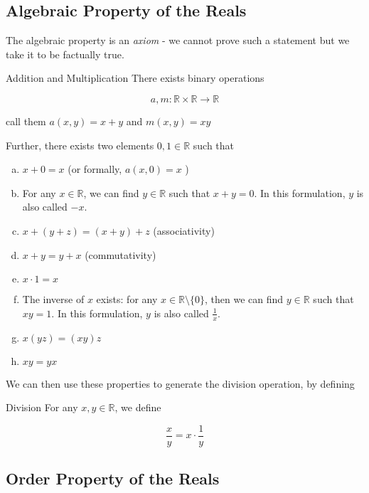 \subsection{Algebraic Property of the Reals} 

The algebraic property is an \textit{axiom} - we cannot prove such a statement but we take it to be factually true.

\begin{definition}{Addition and Multiplication}{}
    There exists binary operations 

    \[ a, m: \mathbb R \times \mathbb R \to \mathbb R\] 

    call them $a(x, y) = x+y$ and $m(x, y) = xy$ 
\end{definition}

Further, there exists two elements $0, 1 \in \mathbb R$ such that 

\begin{enumerate}[(a)]
    \item $x + 0 = x$ (or formally, $a(x, 0) = x$ )
    \item For any $x \in \mathbb R$, we can find $y \in \mathbb R$ such that $x + y = 0$. In this formulation, $y$ is also called $-x$.
    \item $x + (y + z) = (x + y) + z$ (associativity)
    \item $x + y = y + x$ (commutativity)
    \item $x \cdot 1 = x$
    \item The inverse of $x$ exists: for any $x \in \mathbb R \setminus \{0\}$, then we can find $y \in \mathbb R$ such that $xy = 1$. In this formulation, $y$ is also called $\frac 1x$. 
    \item $x(yz) = (xy)z$
    \item $xy = yx$
\end{enumerate}

We can then use these properties to generate the division operation, by defining 

\begin{definition}{Division}{}
    For any $x, y \in \mathbb R$, we define 

    \[ \frac xy = x \cdot \frac 1y\]
\end{definition}

\subsection{Order Property of the Reals}

